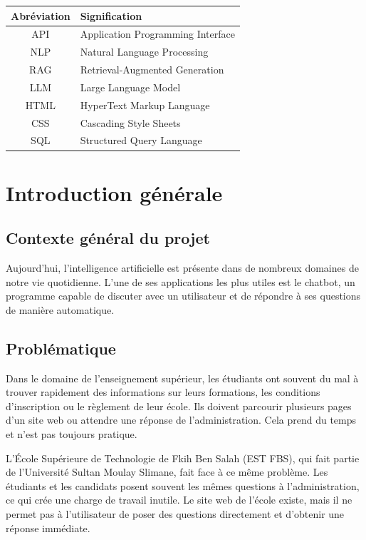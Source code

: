 \documentclass[12pt,a4paper]{report}
\begin{document}
\begin{longtable}{|c|m{10cm}|}
\hline
\textbf{Abréviation} & \textbf{Signification} \\ \hline
API & Application Programming Interface \\ \hline
NLP & Natural Language Processing \\ \hline
RAG & Retrieval-Augmented Generation \\ \hline
LLM & Large Language Model \\ \hline
HTML & HyperText Markup Language \\ \hline
CSS & Cascading Style Sheets \\ \hline
SQL & Structured Query Language \\ \hline
\end{longtable}

\newpage

\listoffigures
\newpage

\listoftables
\newpage

\tableofcontents
\newpage


\chapter{Introduction générale}

\section{Contexte général du projet}
Aujourd'hui, l'intelligence artificielle est présente dans de nombreux domaines de notre vie quotidienne. L'une de ses applications les plus utiles est le chatbot, un programme capable de discuter avec un utilisateur et de répondre à ses questions de manière 
\newline
automatique.

\section{Problématique}
Dans le domaine de l'enseignement supérieur, les étudiants ont souvent du mal à trouver rapidement des informations sur leurs formations, les conditions d'inscription ou le règlement de leur école. Ils doivent parcourir plusieurs pages d'un site web ou attendre une réponse de l'administration. Cela prend du temps et n'est pas toujours pratique.

L'École Supérieure de Technologie de Fkih Ben Salah (EST FBS), qui fait partie de l'Université Sultan Moulay Slimane, fait face à ce même problème. Les étudiants et les candidats posent souvent les mêmes questions à l'administration, ce qui crée une charge de travail inutile. Le site web de l'école existe, mais il ne permet pas à l'utilisateur de poser des questions directement et d'obtenir une réponse immédiate.
\end{document}
